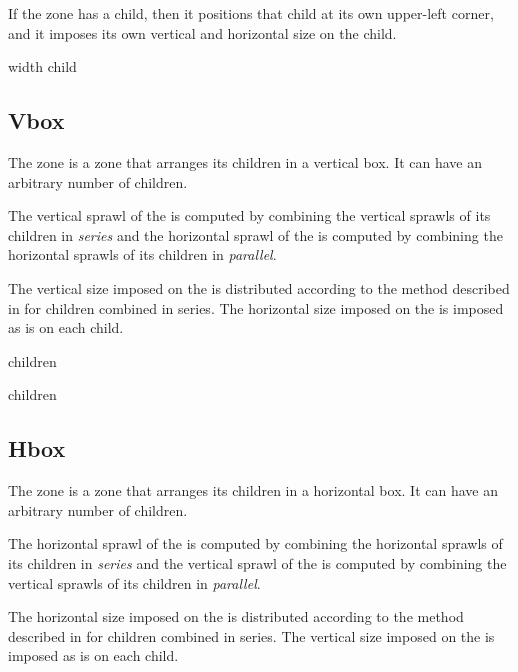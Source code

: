 If the  zone has a child, then it positions that child at
its own upper-left corner, and it imposes its own vertical and
horizontal size on the child.


 {width \optional child}

\subsection{Vbox}
\label{sec-zones-layout-vbox}

The  zone is a zone that arranges its children in a
vertical box.  It can have an arbitrary number of children.

The vertical sprawl of the  is computed by combining the
vertical sprawls of its children in \emph{series} and the horizontal
sprawl of the  is computed by combining the horizontal
sprawls of its children in \emph{parallel}.

The vertical size imposed on the  is distributed according
to the method described in 
for children combined in series.  The horizontal size imposed on the
 is imposed as is on each child. 


 {children}

 {\rest children}

\subsection{Hbox}
\label{sec-zones-layout-hbox}

The  zone is a zone that arranges its children in a
horizontal box.  It can have an arbitrary number of children.

The horizontal sprawl of the  is computed by combining the
horizontal sprawls of its children in \emph{series} and the vertical
sprawl of the  is computed by combining the vertical
sprawls of its children in \emph{parallel}.

The horizontal size imposed on the  is distributed according
to the method described in 
for children combined in series.  The vertical size imposed on the
 is imposed as is on each child. 

